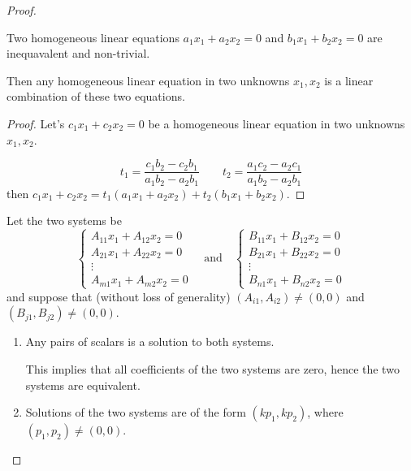 \begin{proof}
    \begin{lemma}\label{lemma:exercise:linear-combination-of-inequivalent-linear-equations}
        Two homogeneous linear equations $a_{1}x_{1} + a_{2}x_{2} = 0$ and $b_{1}x_{1} + b_{2}x_{2} = 0$ are inequavalent and non-trivial.

        Then any homogeneous linear equation in two unknowns $x_{1}, x_{2}$ is a linear combination of these two equations.
    \end{lemma}
    \begin{proof}
        Let's $c_{1}x_{1} + c_{2}x_{2} = 0$ be a homogeneous linear equation in two unknowns $x_{1}, x_{2}$.

        \[
            t_{1} = \frac{c_{1}b_{2} - c_{2}b_{1}}{a_{1}b_{2} - a_{2}b_{1}}\qquad t_{2} = \frac{a_{1}c_{2} - a_{2}c_{1}}{a_{1}b_{2} - a_{2}b_{1}}
        \]
        then $c_{1}x_{1} + c_{2}x_{2} = t_{1}(a_{1}x_{1} + a_{2}x_{2}) + t_{2}(b_{1}x_{1} + b_{2}x_{2})$.
    \end{proof}

    Let the two systems be
    \[
        \begin{cases}
            A_{11}x_{1} + A_{12}x_{2} = 0 \\
            A_{21}x_{1} + A_{22}x_{2} = 0 \\
            \vdots                        \\
            A_{m1}x_{1} + A_{m2}x_{2} = 0
        \end{cases}
        \quad\text{and}\quad
        \begin{cases}
            B_{11}x_{1} + B_{12}x_{2} = 0 \\
            B_{21}x_{1} + B_{22}x_{2} = 0 \\
            \vdots                        \\
            B_{n1}x_{1} + B_{n2}x_{2} = 0
        \end{cases}
    \]
    and suppose that (without loss of generality) $(A_{i1}, A_{i2})\ne (0, 0)$ and $(B_{j1}, B_{j2})\ne (0, 0)$.

    \begin{enumerate}[label = \textbf{Case \arabic*.}, itemindent=1cm]
        \item Any pairs of scalars is a solution to both systems.

              This implies that all coefficients of the two systems are zero, hence the two systems are equivalent.
        \item Solutions of the two systems are of the form $(kp_{1}, kp_{2})$, where $(p_{1}, p_{2})\ne (0, 0)$.


\end{enumerate}
\end{proof}
